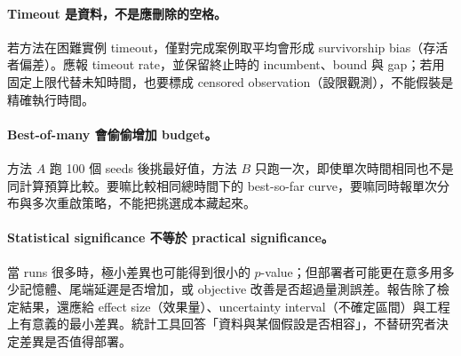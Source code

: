 \documentclass[11pt,a4paper,oneside,openany]{book}
\begin{document}
\paragraph{Timeout 是資料，不是應刪除的空格。}
若方法在困難實例 timeout，僅對完成案例取平均會形成 survivorship bias（存活者偏差）。應報 timeout rate，並保留終止時的 incumbent、bound 與 gap；若用固定上限代替未知時間，也要標成 censored observation（設限觀測），不能假裝是精確執行時間。

\paragraph{Best-of-many 會偷偷增加 budget。}
方法 $A$ 跑 100 個 seeds 後挑最好值，方法 $B$ 只跑一次，即使單次時間相同也不是同計算預算比較。要嘛比較相同總時間下的 best-so-far curve，要嘛同時報單次分布與多次重啟策略，不能把挑選成本藏起來。

\paragraph{Statistical significance 不等於 practical significance。}
當 runs 很多時，極小差異也可能得到很小的 $p$-value；但部署者可能更在意多用多少記憶體、尾端延遲是否增加，或 objective 改善是否超過量測誤差。報告除了檢定結果，還應給 effect size（效果量）、uncertainty interval（不確定區間）與工程上有意義的最小差異。統計工具回答「資料與某個假設是否相容」，不替研究者決定差異是否值得部署。
\end{document}
